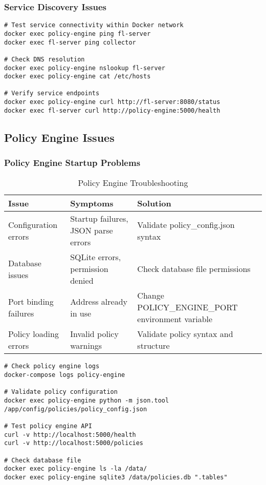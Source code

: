 \subsubsection{Service Discovery Issues}

\begin{lstlisting}[style=bashcode, caption=Service Discovery Debugging]
# Test service connectivity within Docker network
docker exec policy-engine ping fl-server
docker exec fl-server ping collector

# Check DNS resolution
docker exec policy-engine nslookup fl-server
docker exec policy-engine cat /etc/hosts

# Verify service endpoints
docker exec policy-engine curl http://fl-server:8080/status
docker exec fl-server curl http://policy-engine:5000/health
\end{lstlisting}

\subsection{Policy Engine Issues}

\subsubsection{Policy Engine Startup Problems}

\begin{table}[H]
\centering
\caption{Policy Engine Troubleshooting}
\label{tab:policy-engine-issues}
\begin{tabularx}{\textwidth}{@{}lXX@{}}
\toprule
\textbf{Issue} & \textbf{Symptoms} & \textbf{Solution} \\
\midrule
Configuration errors & Startup failures, JSON parse errors & Validate policy\_config.json syntax \\
Database issues & SQLite errors, permission denied & Check database file permissions \\
Port binding failures & Address already in use & Change POLICY\_ENGINE\_PORT environment variable \\
Policy loading errors & Invalid policy warnings & Validate policy syntax and structure \\
\bottomrule
\end{tabularx}
\end{table}

\begin{lstlisting}[style=bashcode, caption=Policy Engine Diagnostics]
# Check policy engine logs
docker-compose logs policy-engine

# Validate policy configuration
docker exec policy-engine python -m json.tool /app/config/policies/policy_config.json

# Test policy engine API
curl -v http://localhost:5000/health
curl -v http://localhost:5000/policies

# Check database file
docker exec policy-engine ls -la /data/
docker exec policy-engine sqlite3 /data/policies.db ".tables"
\end{lstlisting}

